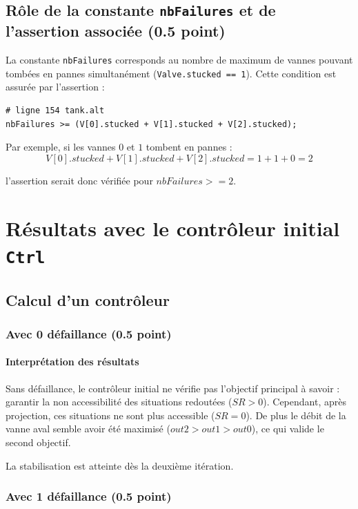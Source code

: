 \documentclass[a4paper]{book}
\begin{document}
\subsection{Rôle de la constante {\tt nbFailures} et de l'assertion associée (0.5 point)}

La constante \texttt{nbFailures} corresponds au nombre de maximum de vannes
pouvant tombées en pannes simultanément (\texttt{Valve.stucked == 1}). Cette
condition est assurée par l'assertion :
\begin{verbatim}
# ligne 154 tank.alt
nbFailures >= (V[0].stucked + V[1].stucked + V[2].stucked);
\end{verbatim}

Par exemple, si les vannes $0$ et $1$ tombent en pannes :
$$
V[0].stucked + V[1].stucked + V[2].stucked = 1 + 1 + 0 = 2
$$

l'assertion serait donc vérifiée pour $nbFailures >= 2$.

\section{Résultats avec le contrôleur initial {\tt Ctrl}}
\subsection{Calcul d'un contrôleur}
\subsubsection{Avec 0 défaillance (0.5 point)}

\paragraph{Interprétation des résultats}

Sans défaillance, le contrôleur initial ne vérifie pas l'objectif principal à
savoir : garantir la non accessibilité des situations redoutées ($SR > 0$).
Cependant, après projection, ces situations ne sont plus accessible ($SR = 0$).
De plus le débit de la vanne aval semble avoir été maximisé ($out2 > out1 >
out0$), ce qui valide le second objectif.

La stabilisation est atteinte dès la deuxième itération.

\subsubsection{Avec 1 défaillance (0.5 point)}

\end{document}
